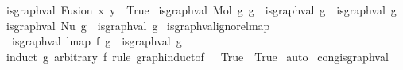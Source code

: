 \begin{isabellebody}
{\isacharbar}{\kern0pt}\ {\isachardoublequoteopen}is{\isacharunderscore}{\kern0pt}graph{\isacharunderscore}{\kern0pt}val\ {\isacharparenleft}{\kern0pt}Fusion\ x\ y{\isacharparenright}{\kern0pt}\ {\isacharequal}{\kern0pt}\ True{\isachardoublequoteclose}\isanewline
{\isacharbar}{\kern0pt}\ {\isachardoublequoteopen}is{\isacharunderscore}{\kern0pt}graph{\isacharunderscore}{\kern0pt}val\ {\isacharparenleft}{\kern0pt}Mol\ g{}\ g{}{\isacharparenright}{\kern0pt}\ {\isacharequal}{\kern0pt}\ {\isacharparenleft}{\kern0pt}is{\isacharunderscore}{\kern0pt}graph{\isacharunderscore}{\kern0pt}val\ g{}\ {\isasymand}\ is{\isacharunderscore}{\kern0pt}graph{\isacharunderscore}{\kern0pt}val\ g{}{\isacharparenright}{\kern0pt}{\isachardoublequoteclose}\isanewline
{\isacharbar}{\kern0pt}\ {\isachardoublequoteopen}is{\isacharunderscore}{\kern0pt}graph{\isacharunderscore}{\kern0pt}val\ {\isacharparenleft}{\kern0pt}Nu\ g{\isacharparenright}{\kern0pt}\ {\isacharequal}{\kern0pt}\ is{\isacharunderscore}{\kern0pt}graph{\isacharunderscore}{\kern0pt}val\ g{\isachardoublequoteclose}\isanewline
\isanewline
\isanewline
\isanewline
{}\isamarkupfalse%
\ is{\isacharunderscore}{\kern0pt}graph{\isacharunderscore}{\kern0pt}val{\isacharunderscore}{\kern0pt}ignore{\isacharunderscore}{\kern0pt}lmap{\isacharcolon}{\kern0pt}\isanewline
\ \ {\isachardoublequoteopen}is{\isacharunderscore}{\kern0pt}graph{\isacharunderscore}{\kern0pt}val\ {\isacharparenleft}{\kern0pt}lmap\ f\ g{\isacharparenright}{\kern0pt}\ {\isacharequal}{\kern0pt}\ is{\isacharunderscore}{\kern0pt}graph{\isacharunderscore}{\kern0pt}val\ g{\isachardoublequoteclose}\isanewline
%
\isadelimproof
%
\endisadelimproof
%
\isatagproof
{}\isamarkupfalse%
\ {\isacharparenleft}{\kern0pt}induct\ g\ arbitrary{\isacharcolon}{\kern0pt}\ f\ rule{\isacharcolon}{\kern0pt}\ graph{\isachardot}{\kern0pt}induct{\isacharbrackleft}{\kern0pt}of\ {\isacharunderscore}{\kern0pt}\ {\isachardoublequoteopen}{\isacharpercent}{\kern0pt}{\isacharunderscore}{\kern0pt}{\isachardot}{\kern0pt}\ True{\isachardoublequoteclose}\ {\isachardoublequoteopen}{\isacharpercent}{\kern0pt}{\isacharunderscore}{\kern0pt}{\isachardot}{\kern0pt}\ True{\isachardoublequoteclose}{\isacharbrackright}{\kern0pt}{\isacharparenright}{\kern0pt}\isanewline
{}\isamarkupfalse%
\ auto%
\endisatagproof
{\isafoldproof}%
%
\isadelimproof
\isanewline
%
\endisadelimproof
\isanewline
\isanewline
{}\isamarkupfalse%
\ cong{\isacharunderscore}{\kern0pt}is{\isacharunderscore}{\kern0pt}graph{\isacharunderscore}{\kern0pt}val{\isacharcolon}{\kern0pt}\isanewline

\end{isabellebody}
